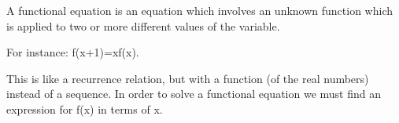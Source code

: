 A functional equation is an equation which involves an unknown function
which is applied to two or more different values of the variable.
\par
For instance: f(x+1)=xf(x).
\par
This is like a recurrence relation, but with a function (of the real numbers)
instead of a sequence. In order to solve a functional equation we must
find an expression for f(x) in terms of x.